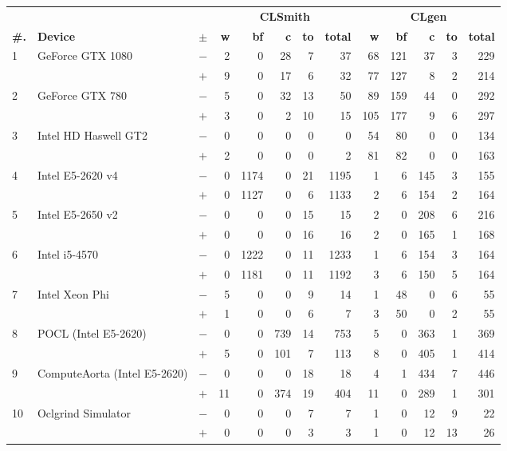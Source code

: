   \begin{tabular}{lll | rrrrr | rrrrr }
  \toprule
  & & & \multicolumn{5}{c|}{\textbf{CLSmith}} & \multicolumn{5}{c}{\textbf{CLgen}} \\
  \textbf{\#.} & \textbf{Device} & $\pm$ &
  \textbf{w} & \textbf{bf} & \textbf{c} & \textbf{to} & \textbf{total} &
  \textbf{w} & \textbf{bf} & \textbf{c} & \textbf{to} & \textbf{total} \\
  \midrule
  \multirow{ 2}{*}{1} & \multirow{ 2}{*}{GeForce GTX 1080} & $-$ & 2 & 0 & 28 & 7 & 37       & 68 & 121 & 37 & 3 & 229 \\& & $+$ & 9 & 0 & 17 & 6 & 32 & 77 & 127 & 8 & 2 & 214 \\
\hline
\multirow{ 2}{*}{2} & \multirow{ 2}{*}{GeForce GTX 780} & $-$ & 5 & 0 & 32 & 13 & 50       & 89 & 159 & 44 & 0 & 292 \\& & $+$ & 3 & 0 & 2 & 10 & 15 & 105 & 177 & 9 & 6 & 297 \\
\hline
\multirow{ 2}{*}{3} & \multirow{ 2}{*}{Intel HD Haswell GT2} & $-$ & 0 & 0 & 0 & 0 & 0       & 54 & 80 & 0 & 0 & 134 \\& & $+$ & 2 & 0 & 0 & 0 & 2 & 81 & 82 & 0 & 0 & 163 \\
\hline
\multirow{ 2}{*}{4} & \multirow{ 2}{*}{Intel E5-2620 v4} & $-$ & 0 & 1174 & 0 & 21 & 1195       & 1 & 6 & 145 & 3 & 155 \\& & $+$ & 0 & 1127 & 0 & 6 & 1133 & 2 & 6 & 154 & 2 & 164 \\
\hline
\multirow{ 2}{*}{5} & \multirow{ 2}{*}{Intel E5-2650 v2} & $-$ & 0 & 0 & 0 & 15 & 15       & 2 & 0 & 208 & 6 & 216 \\& & $+$ & 0 & 0 & 0 & 16 & 16 & 2 & 0 & 165 & 1 & 168 \\
\hline
\multirow{ 2}{*}{6} & \multirow{ 2}{*}{Intel i5-4570} & $-$ & 0 & 1222 & 0 & 11 & 1233       & 1 & 6 & 154 & 3 & 164 \\& & $+$ & 0 & 1181 & 0 & 11 & 1192 & 3 & 6 & 150 & 5 & 164 \\
\hline
\multirow{ 2}{*}{7} & \multirow{ 2}{*}{Intel Xeon Phi} & $-$ & 5 & 0 & 0 & 9 & 14       & 1 & 48 & 0 & 6 & 55 \\& & $+$ & 1 & 0 & 0 & 6 & 7 & 3 & 50 & 0 & 2 & 55 \\
\hline
\multirow{ 2}{*}{8} & \multirow{ 2}{*}{POCL (Intel E5-2620)} & $-$ & 0 & 0 & 739 & 14 & 753       & 5 & 0 & 363 & 1 & 369 \\& & $+$ & 5 & 0 & 101 & 7 & 113 & 8 & 0 & 405 & 1 & 414 \\
\hline
\multirow{ 2}{*}{9} & \multirow{ 2}{*}{ComputeAorta (Intel E5-2620)} & $-$ & 0 & 0 & 0 & 18 & 18       & 4 & 1 & 434 & 7 & 446 \\& & $+$ & 11 & 0 & 374 & 19 & 404 & 11 & 0 & 289 & 1 & 301 \\
\hline
\multirow{ 2}{*}{10} & \multirow{ 2}{*}{Oclgrind Simulator} & $-$ & 0 & 0 & 0 & 7 & 7       & 1 & 0 & 12 & 9 & 22 \\& & $+$ & 0 & 0 & 0 & 3 & 3 & 1 & 0 & 12 & 13 & 26 \\
  \bottomrule
\end{tabular}

